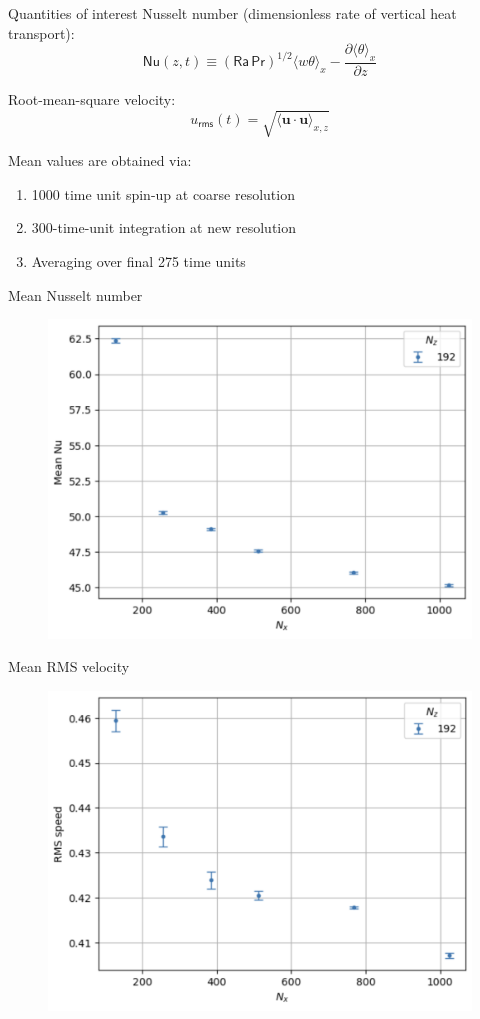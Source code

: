 \documentclass[12pt, aspectratio=169]{beamer}
\newcommand{\pdiff}[2]{\frac{\partial #1}{\partial #2}}
\renewcommand\vec{\bm}
\newcommand{\prandtl}{\ensuremath{\mathsf{Pr}}}
\newcommand{\rayleigh}{\ensuremath{\mathsf{Ra}}}
\newcommand{\nusselt}{\ensuremath{\mathsf{Nu}}}
\begin{document}
\begin{frame}{Quantities of interest}
Nusselt number (dimensionless rate of vertical heat transport):
\begin{equation*}
    \nusselt(z,t) \equiv (\rayleigh\,\prandtl)^{1/2} \langle w \theta \rangle_x
        - \pdiff{\langle \theta \rangle_x}{z}
\end{equation*}

Root-mean-square velocity:
\begin{equation*}
    u_\mathsf{rms}(t) = \sqrt{\langle \vec{u} \cdot \vec{u} \rangle_{x,z}}
\end{equation*}

Mean values are obtained via:
\begin{enumerate}
    \item 1000 time unit spin-up at coarse resolution
    \item 300-time-unit integration at new resolution
    \item Averaging over final 275 time units
\end{enumerate}
\end{frame}

\begin{frame}{Mean Nusselt number}
\begin{figure}
    \centering
    \includegraphics[width=0.6\linewidth]{figures/nu_dependence.png}
\end{figure}
\end{frame}

\begin{frame}{Mean RMS velocity}
    \begin{figure}
        \centering
        \includegraphics[width=0.6\linewidth]{figures/urms_dependence.png}
    \end{figure}
\end{frame}
\end{document}
